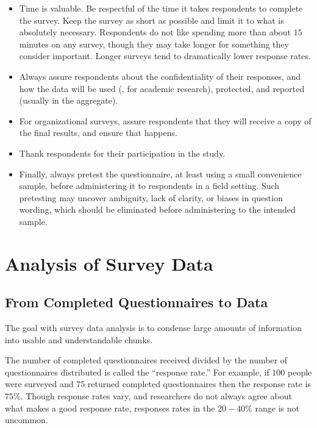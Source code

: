 \begin{itemize}
	\item Time is valuable. Be respectful of the time it takes respondents to complete the survey. Keep the survey as short as possible and limit it to what is absolutely necessary. Respondents do not like spending more than about $ 15 $ minutes on any survey, though they may take longer for something they consider important. Longer surveys tend to dramatically lower response rates.

	\item Always assure respondents about the confidentiality of their responses, and how the data will be used (\eg, for academic research), protected, and reported (usually in the aggregate).

	\item For organizational surveys, assure respondents that they will receive a copy of the final results, and ensure that happens.

	\item Thank respondents for their participation in the study.

	\item Finally, always pretest the questionnaire, at least using a small convenience sample, before administering it to respondents in a field setting. Such pretesting may uncover ambiguity, lack of clarity, or biases in question wording, which should be eliminated before administering to the intended sample.
\end{itemize}

\section{Analysis of Survey Data}

\subsection{From Completed Questionnaires to Data}

The goal with survey data analysis is to condense large amounts of information into usable and understandable chunks. 

The number of completed questionnaires received divided by the number of questionnaires  distributed is called the ``response rate.'' For example, if $ 100 $ people were surveyed and $ 75 $ returned completed questionnaires then the response rate is $ 75\% $. Though response rates vary, and researchers do not always agree about what makes a good response rate, responses rates in the $ 20-40\% $ range is not uncommon. 

